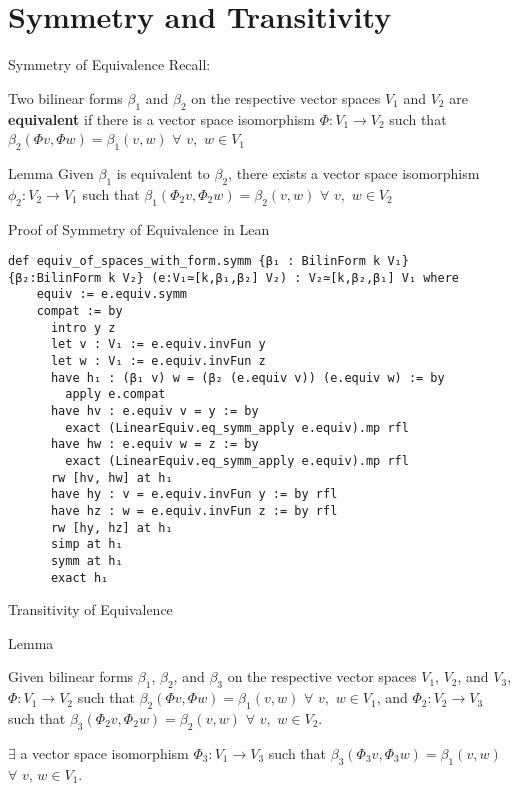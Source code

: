 \documentclass[svgnames]{beamer}
\begin{document}
\section{Symmetry and Transitivity}

\begin{frame}{Symmetry of Equivalence}
Recall:
\begin{Definition}
Two bilinear forms $\beta_1$ and $\beta_2$ on the respective vector spaces $V_1$ and $V_2$ are \textbf{equivalent} if there is a vector space isomorphism $\Phi:V_1\to V_2$ such that $\beta_2 (\Phi v,\Phi w)= \beta_1 (v,w)$ $\forall$ $v,$ $w\in V_1$
\end{Definition}

\pause

\begin{block}{Lemma}
Given $\beta_1$ is equivalent to $\beta_2$, there exists a vector space isomorphism $\phi_2 : V_2 \rightarrow V_1$ such that $\beta_1 (\Phi_2 v,\Phi_2 w)= \beta_2 (v,w)$ $\forall$ $v,$ $w\in V_2$
\end{block}
\end{frame}

\begin{frame}[label={sec:proof_comparison},fragile]{Proof of Symmetry of Equivalence in Lean}
\begin{itemize}
\end{itemize}
{\scriptsize
\begin{verbatim}
def equiv_of_spaces_with_form.symm {β₁ : BilinForm k V₁} 
{β₂:BilinForm k V₂} (e:V₁≃[k,β₁,β₂] V₂) : V₂≃[k,β₂,β₁] V₁ where
    equiv := e.equiv.symm
    compat := by
      intro y z
      let v : V₁ := e.equiv.invFun y
      let w : V₁ := e.equiv.invFun z
      have h₁ : (β₁ v) w = (β₂ (e.equiv v)) (e.equiv w) := by
        apply e.compat
      have hv : e.equiv v = y := by 
        exact (LinearEquiv.eq_symm_apply e.equiv).mp rfl
      have hw : e.equiv w = z := by 
        exact (LinearEquiv.eq_symm_apply e.equiv).mp rfl
      rw [hv, hw] at h₁
      have hy : v = e.equiv.invFun y := by rfl
      have hz : w = e.equiv.invFun z := by rfl
      rw [hy, hz] at h₁
      simp at h₁
      symm at h₁
      exact h₁
\end{verbatim}
}
\end{frame}

\begin{frame}[label={sec:proof_comparison},fragile]{Transitivity of Equivalence}
\begin{block}{Lemma}

Given bilinear forms $\beta_1$, $\beta_2$, and $\beta_3$ on the respective vector spaces $V_1$, $V_2$, and $V_3$, $\Phi:V_1\to V_2$ such that $\beta_2 (\Phi v,\Phi w)= \beta_1 (v,w)$ $\forall$ $v,$ $w\in V_1$, and $\Phi_2:V_2\to V_3$ such that $\beta_3 (\Phi_2 v,\Phi_2 w)= \beta_2 (v,w)$ $\forall$ $v,$ $w\in V_2$. 

$\exists$ a vector space isomorphism $\Phi_3 : V_1 \to V_3$ such that $\beta_3 (\Phi_3 v,\Phi_3 w)= \beta_1 (v,w)$ $\forall$ $v$, $w \in V_1$.
\end{block}
\end{frame}
\end{document}
